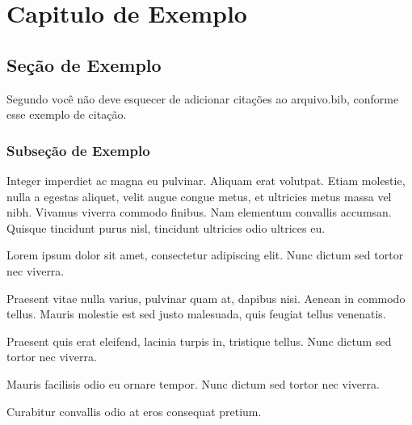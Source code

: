 \chapter{Capitulo de Exemplo}
\label{cap:exemplo}

\lipsum[5]
\lipsum[6]
\lipsum[7]

\section{Seção de Exemplo}
\label{sec:exemplo}

Segundo \cite{citacaoLamport} você não deve esquecer de adicionar citações ao arquivo.bib, conforme esse exemplo de citação.

\lipsum[2]

\subsection{Subseção de Exemplo}
\label{sec:exemplo-exemplo}

Integer imperdiet ac magna eu pulvinar. Aliquam erat volutpat. Etiam molestie, nulla a egestas aliquet, velit augue congue metus, et ultricies metus massa vel nibh. Vivamus viverra commodo finibus. Nam elementum convallis accumsan. Quisque tincidunt purus nisl, tincidunt ultricies odio ultrices eu.

\begin{alineas}
	\item Lorem ipsum dolor sit amet, consectetur adipiscing elit. Nunc dictum sed tortor nec viverra.
	\item Praesent vitae nulla varius, pulvinar quam at, dapibus nisi. Aenean in commodo tellus. Mauris molestie est sed justo malesuada, quis feugiat tellus venenatis.
	\item Praesent quis erat eleifend, lacinia turpis in, tristique tellus. Nunc dictum sed tortor nec viverra.
	\item Mauris facilisis odio eu ornare tempor. Nunc dictum sed tortor nec viverra.
	\item Curabitur convallis odio at eros consequat pretium.
\end{alineas}